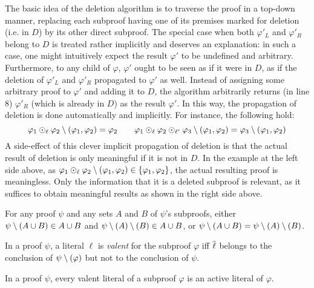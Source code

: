 \documentclass{llncs}
\begin{document}
The basic idea of the deletion algorithm is to traverse the proof in a top-down manner, replacing
each subproof having one of its premises marked for deletion (i.e. in $D$) by its other direct
subproof. The special case when both $\varphi'_L$ and $\varphi'_R$ belong to $D$ is treated rather
implicitly and deserves an explanation: in such a case, one might intuitively expect the result
$\varphi'$ to be undefined and arbitrary. Furthermore, to any child of $\varphi$, $\varphi'$ ought
to be seen as if it were in $D$, as if the deletion of $\varphi'_L$ and $\varphi'_R$ propagated to
$\varphi'$ as well. Instead of assigning some arbitrary proof to $\varphi'$ and adding it to $D$,
the algorithm arbitrarily returns (in line 8) $\varphi'_R$ (which is already in $D$) as the result
$\varphi'$. In this way, the propagation of deletion is done automatically and implicitly. For
instance, the following hold:
$$
\varphi_1 \odot_\ell \varphi_2 \setminus (\varphi_1, \varphi_2) = \varphi_2
\qquad
\varphi_1 \odot_\ell \varphi_2 \odot_{\ell'} \varphi_3 \setminus (\varphi_1, \varphi_2) =
  \varphi_3 \setminus (\varphi_1, \varphi_2)
$$
A side-effect of this clever implicit propagation of deletion is that the actual result of deletion
is only meaningful if it is not in $D$. In the example at the left side above, as $\varphi_1
\odot_\ell \varphi_2 \setminus (\varphi_1, \varphi_2) \in \{\varphi_1, \varphi_2\} $, the actual resulting
proof is meaningless. Only the information that it is a deleted subproof is relevant, as it suffices
to obtain meaningful results as shown in the right side above.

\begin{proposition} \label{prop:del_assoc}
For any proof $\psi$ and any sets $A$ and $B$ of $\psi$'s subproofs,
either $\psi \setminus (A \cup B)  \in A \cup B$
and    $\psi \setminus (A) \setminus (B) \in A \cup B$,
or     $\psi \setminus (A \cup B) = \psi \setminus (A) \setminus (B)$.
\end{proposition}


\begin{definition}
  In a proof $\psi$, a literal $\ell$ is \emph{valent} for the subproof $\varphi$ iff $\overline{\ell}$
  belongs to the conclusion of $\psi \setminus (\varphi)$ but not to the conclusion of $\psi$.
\end{definition}

\begin{proposition} \label{prop:valentactive}
In a proof $\psi$, every valent literal of a subproof $\varphi$ is an active literal of $\varphi$.
\end{proposition}
\end{document}
